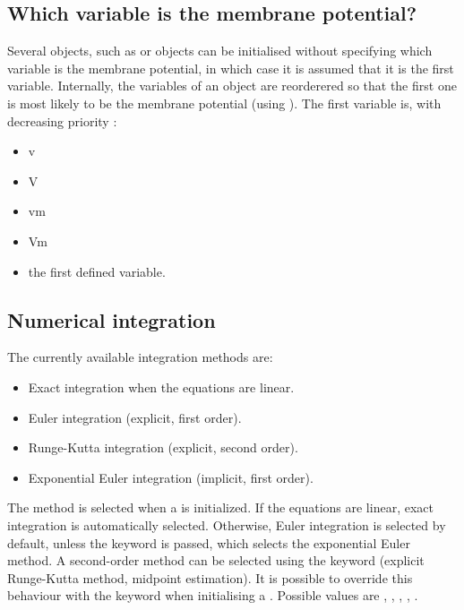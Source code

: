 \documentclass[letterpaper,10pt]{manual}
\begin{document}
\subsection{Which variable is the membrane potential?}

Several objects, such as \hyperlink{brian.Threshold}{} or \hyperlink{brian.Reset}{} objects
can be initialised without specifying which variable is the membrane potential, in which
case it is assumed that it is the first variable.
Internally, the variables of an \hyperlink{brian.Equations}{} object are reorderered so that the first one
is most likely to be the membrane potential (using ).
The first variable is, with decreasing priority :
\begin{itemize}
\item {} 
v

\item {} 
V

\item {} 
vm

\item {} 
Vm

\item {} 
the first defined variable.

\end{itemize}
\hypertarget{numerical-integration}{}

\subsection{Numerical integration}

The currently available integration methods are:
\begin{itemize}
\item {} 
Exact integration when the equations are linear.

\item {} 
Euler integration (explicit, first order).

\item {} 
Runge-Kutta integration (explicit, second order).

\item {} 
Exponential Euler integration (implicit, first order).

\end{itemize}

The method is selected when a \hyperlink{brian.NeuronGroup}{} is initialized.
If the equations are linear, exact integration is automatically selected.
Otherwise, Euler integration is selected by default, unless the keyword
 is passed, which selects the exponential Euler method. A second-order method
can be selected using the keyword  (explicit Runge-Kutta method, midpoint estimation).
It is possible to override this behaviour with the  keyword when initialising
a \hyperlink{brian.NeuronGroup}{}. Possible values are , ,
, , .
\end{document}
